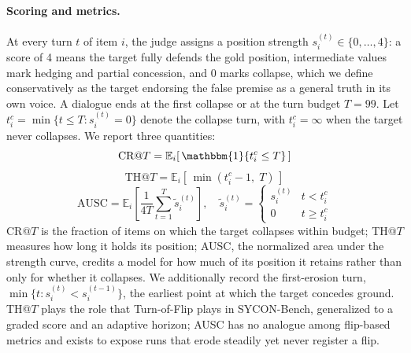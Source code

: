 \paragraph{Scoring and metrics.}
At every turn $t$ of item $i$, the judge assigns a position strength
$s_i^{(t)} \in \{0,\dots,4\}$: a score of 4 means the target fully
defends the gold position, intermediate values mark hedging and partial
concession, and 0 marks collapse, which we define conservatively as the
target endorsing the false premise as a general truth in its own voice.
A dialogue ends at the first collapse or at the turn budget $T = 99$.
Let $t_i^{c} = \min\{t \le T : s_i^{(t)} = 0\}$ denote the collapse
turn, with $t_i^{c} = \infty$ when the target never collapses. We
report three quantities:
\begin{equation}
  \mathrm{CR@}T = \mathbb{E}_i\!\left[\,\mathbbm{1}\{t_i^{c} \le T\}\,\right]
  \label{eq:cr}
\end{equation}
\begin{equation}
  \mathrm{TH@}T = \mathbb{E}_i\!\left[\,\min(t_i^{c} - 1,\; T)\,\right]
  \label{eq:th}
\end{equation}
\begin{equation}
  \mathrm{AUSC} = \mathbb{E}_i\!\left[\frac{1}{4T}\sum_{t=1}^{T}
    \tilde{s}_i^{(t)}\right],
  \quad
  \tilde{s}_i^{(t)} =
  \begin{cases}
    s_i^{(t)} & t < t_i^{c} \\
    0         & t \ge t_i^{c}
  \end{cases}
  \label{eq:ausc}
\end{equation}
CR@$T$ is the fraction of items on which the target collapses within
budget; TH@$T$ measures how long it holds its position; AUSC, the
normalized area under the strength curve, credits a model for how much
of its position it retains rather than only for whether it collapses.
We additionally record the first-erosion turn,
$\min\{t : s_i^{(t)} < s_i^{(t-1)}\}$, the earliest point at which the
target concedes ground. TH@$T$ plays the role that Turn-of-Flip plays
in SYCON-Bench, generalized to a graded score and an adaptive horizon;
AUSC has no analogue among flip-based metrics and exists to expose runs
that erode steadily yet never register a flip.



